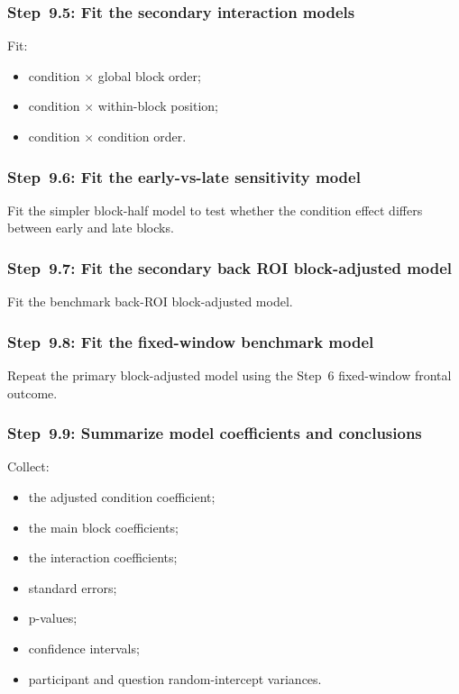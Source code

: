 \subsubsection{Step~9.5: Fit the secondary interaction models}
Fit:
\begin{itemize}
    \item condition \(\times\) global block order;
    \item condition \(\times\) within-block position;
    \item condition \(\times\) condition order.
\end{itemize}

\subsubsection{Step~9.6: Fit the early-vs-late sensitivity model}
Fit the simpler block-half model to test whether the condition effect differs between early and late blocks.

\subsubsection{Step~9.7: Fit the secondary back ROI block-adjusted model}
Fit the benchmark back-ROI block-adjusted model.

\subsubsection{Step~9.8: Fit the fixed-window benchmark model}
Repeat the primary block-adjusted model using the Step~6 fixed-window frontal outcome.

\subsubsection{Step~9.9: Summarize model coefficients and conclusions}
Collect:
\begin{itemize}
    \item the adjusted condition coefficient;
    \item the main block coefficients;
    \item the interaction coefficients;
    \item standard errors;
    \item p-values;
    \item confidence intervals;
    \item participant and question random-intercept variances.
\end{itemize}

